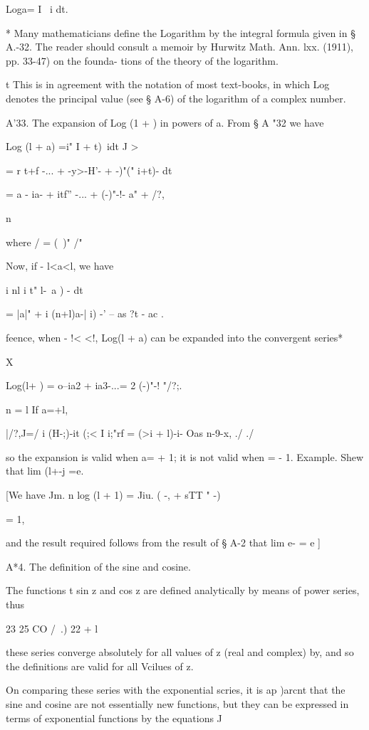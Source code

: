 Loga= I ~i dt.

* Many mathematicians define the Logarithm by the integral formula
given in § A.-32. The reader should consult a memoir by Hurwitz Math.
Ann. lxx. (1911), pp. 33-47) on the founda- tions of the theory of the
logarithm.

t This is in agreement with the notation of most text-books, in which
Log denotes the principal value (see § A-6) of the logarithm of a
complex number.

%
%

A'33. The expansion of Log (1 + ) in powers of a. From § A "32 we have

Log (l + a) =i" I + t)~idt J >

= r t+f -... + -y>-H'- + -)"(" i+t)- dt

= a - ia- + itf'' -... + (-)"-!- a" + /?,

n

where / = (\ )" /"%

Now, if - l<a<l, we have

i nl i t" l-\ a ) - dt

= |a|" + i (n+l)a-| i) -' -- as ?t - ac .

feence, when - !< <!, Log(l + a) can be expanded into the convergent
series*

X

Log(l+ ) = o--ia2 + ia3-...= 2 (-)"-! "/?;.

n = l If a=+l,

|/?,J=/ i (H-;)-it (;< I i;"rf = (>i + l)-i- Oas n-9-x, ./ ./

so the expansion is valid when a= + 1; it is not valid when = - 1.
Example. Shew that lim (l+-j =e.

[We have Jm. n log (l + 1) = Jiu. ( -, + sTT " -)

= 1,

and the result required follows from the result of § A-2 that lim e- =
e ]

A*4. The definition of the sine and cosine.

The functions t sin z and cos z are defined analytically by means of
power series, thus

23 25 CO /\ .) 22 + l

these series converge absolutely for all values of z (real and
complex) by, and so the definitions are valid for all Vcilues
of z.

On comparing these series with the exponential scries, it is ap )arcnt
that the sine and cosine are not essentially new functions, but they
can be expressed in terms of exponential functions by the equations J


